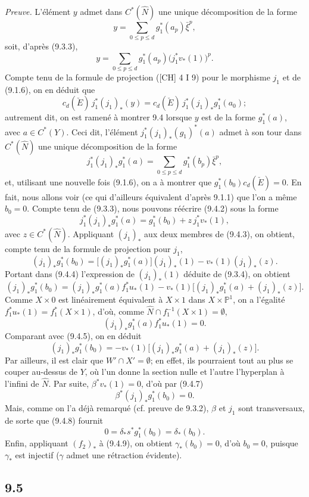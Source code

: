 \documentclass[11pt]{article}
\begin{document}
\emph{Preuve.} L'élément $y$ admet dans $C^*(\widehat N)$ une unique décomposition de la forme
\[
y=\sum_{0\le p\le d}g_1^*(a_p)\bar\xi^p,
\]
soit, d'après (9.3.3),
\[
y=\sum_{0\le p\le d}g_1^*(a_p)\bigl(j_1^*v_*(1)\bigr)^p.
\tag{9.4.1}
\]
Compte tenu de la formule de projection ([CH] 4 I 9) pour le morphisme $j_1$ et de (9.1.6), on en déduit que
\[
c_d(\check E)\,j_1^*(j_1)_*(y)=c_d(\check E)\,j_1^*(j_1)_*g_1^*(a_0);
\]
autrement dit, on est ramené à montrer 9.4 lorsque $y$ est de la forme $g_1^*(a)$, avec $a\in C^*(Y)$. Ceci dit, l'élément $j_1^*(j_1)_*(g_1)^*(a)$ admet à son tour dans $C^*(\widehat N)$ une unique décomposition de la forme
\[
j_1^*(j_1)_*g_1^*(a)=\sum_{0\le p\le d}g_1^*(b_p)\bar\xi^p,
\tag{9.4.2}
\]
et, utilisant une nouvelle fois (9.1.6), on a à montrer que $g_1^*(b_0)c_d(\check E)=0$. En fait, nous allons voir (ce qui d'ailleurs équivalent d'après 9.1.1) que l'on a même $b_0=0$. Compte tenu de (9.3.3), nous pouvons réécrire (9.4.2) sous la forme
\[
j_1^*(j_1)_*g_1^*(a)=g_1^*(b_0)+z\,j_1^*v_*(1),
\tag{9.4.3}
\]
avec $z\in C^*(\widehat N)$. Appliquant $(j_1)_*$ aux deux membres de (9.4.3), on obtient, compte tenu de la formule de projection pour $j_1$,
\[
(j_1)_*g_1^*(b_0)=\bigl[(j_1)_*g_1^*(a)\bigr](j_1)_*(1)-v_*(1)(j_1)_*(z).
\tag{9.4.4}
\]
Portant dans (9.4.4) l'expression de $(j_1)_*(1)$ déduite de (9.3.4), on obtient
\[
(j_1)_*g_1^*(b_0)=
(j_1)_*g_1^*(a)f_1^*u_*(1)-v_*(1)\bigl[(j_1)_*g_1^*(a)+(j_1)_*(z)\bigr].
\tag{9.4.5}
\]
Comme $X\times0$ est linéairement équivalent à $X\times1$ dans $X\times\mathbb P^1$, on a l'égalité $f_1^*u_*(1)=f_1^*(X\times1)$, d'où, comme $\widehat N\cap f_1^{-1}(X\times1)=\emptyset$,
\[
(j_1)_*g_1^*(a)f_1^*u_*(1)=0.
\tag{9.4.6}
\]
Comparant avec (9.4.5), on en déduit
\[
(j_1)_*g_1^*(b_0)=-v_*(1)\bigl[(j_1)_*g_1^*(a)+(j_1)_*(z)\bigr].
\tag{9.4.7}
\]
Par ailleurs, il est clair que $W'\cap X'=\emptyset$; en effet, ils pourraient tout au plus se couper au-dessus de $Y$, où l'un donne la section nulle et l'autre l'hyperplan à l'infini de $\widehat N$. Par suite, $\beta^*v_*(1)=0$, d'où par (9.4.7)
\[
\beta^*(j_1)_*g_1^*(b_0)=0.
\tag{9.4.8}
\]
Mais, comme on l'a déjà remarqué (cf. preuve de 9.3.2), $\beta$ et $j_1$ sont transversaux, de sorte que (9.4.8) fournit
\[
0=\delta_*s^*g_1^*(b_0)=\delta_*(b_0).
\tag{9.4.9}
\]
Enfin, appliquant $(f_2)_*$ à (9.4.9), on obtient $\gamma_*(b_0)=0$, d'où $b_0=0$, puisque $\gamma_*$ est injectif ($\gamma$ admet une rétraction évidente).

\subsection*{9.5}
\end{document}
